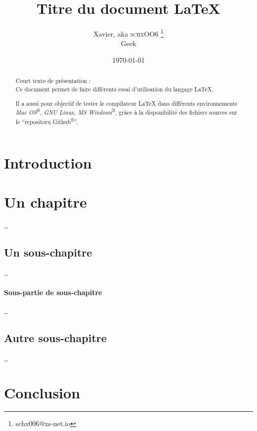 \documentclass[frenchb, 12pt, twoside, a4paper]{article}
\title{Titre du document \LaTeX{}}
\author{Xavier, aka \textsc{schxOO6} \thanks{schx006@xs-net.io} \\
Geek}
\date{\today}                           %
\begin{document}
\maketitle                              %

{
\renewcommand{\contentsname}{Sommaire}  %
\tableofcontents                        %
}


\begin{abstract}
Court texte de présentation : \\
Ce document permet de faire différents essai d'utilisation
du langage \LaTeX{}.

Il a aussi pour objectif de tester le compilateur \LaTeX{}
dans différents environnements 
\emph{Mac OS\textsuperscript{®}, GNU Linux, MS Windows\textsuperscript{®}},
grâce à la disponibilité des fichiers sources sur le 
\enquote{repositoru Github\textsuperscript{®}}.
\end{abstract}



\section*{Introduction}


\section{Un chapitre}
…

\subsection{Un sous-chapitre}
…
\paragraph{Sous-partie de sous-chapitre}
…

\subsection{Autre sous-chapitre}
…

\section*{Conclusion}
\end{document}
